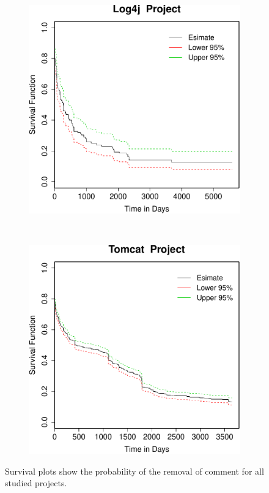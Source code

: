 \begin{figure}[t]
	
	\begin{subfigure}[b]{0.31\textwidth}
		\includegraphics[width=\textwidth]{figures/Survival/log4j.pdf}
	\end{subfigure}
	~
	~
	\begin{subfigure}[b]{0.31\textwidth}
		\includegraphics[width=\textwidth]{figures/Survival/tomcat.pdf}
	\end{subfigure}
	\caption{Survival plots show the probability of the removal of \SATD comment for all studied projects.}
	\label{fig:survival_plots}
\end{figure}

